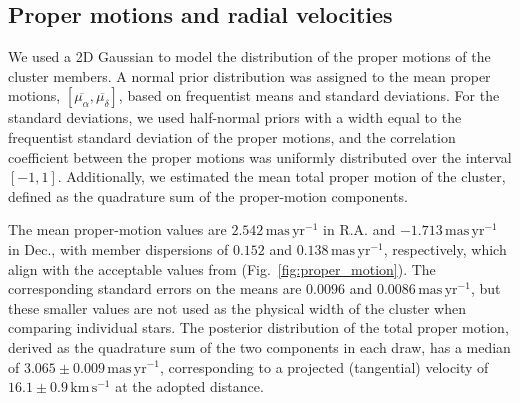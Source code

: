 \documentclass{aa}
\begin{document}
\subsection{Proper motions and radial velocities}\label{subsec:pmrv}
We used a 2D Gaussian to model the distribution of the proper motions of the cluster members. A normal prior distribution was assigned to the mean proper motions, $\left[\overline{\mu_\alpha},\overline{\mu_\delta}\right]$, based on frequentist means and standard deviations. For the standard deviations, we used half-normal priors with a width equal to the frequentist standard deviation of the proper motions, and the correlation coefficient between the proper motions was uniformly distributed over the interval $[-1, 1]$. Additionally, we estimated the mean total proper motion of the cluster, defined as the quadrature sum of the proper-motion components.

The mean proper-motion values are $2.542\,\mathrm{mas\,yr^{-1}}$ in R.A. and $-1.713\,\mathrm{mas\,yr^{-1}}$ in Dec., with member dispersions of $0.152$ and $0.138\,\mathrm{mas\,yr^{-1}}$, respectively, which align with the acceptable values from \citet{2023MNRAS.526.4107P} (Fig.~\ref{fig:proper_motion}). The corresponding standard errors on the means are $0.0096$ and $0.0086\,\mathrm{mas\,yr^{-1}}$, but these smaller values are not used as the physical width of the cluster when comparing individual stars. The posterior distribution of the total proper motion, derived as the quadrature sum of the two components in each draw, has a median of $3.065 \pm 0.009\,\mathrm{mas\,yr^{-1}}$, corresponding to a projected (tangential) velocity of $16.1 \pm 0.9\,\mathrm{km\,s^{-1}}$ at the adopted distance.
\end{document}
